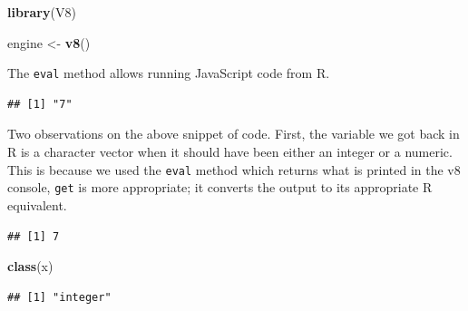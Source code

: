 \documentclass[
]{krantz}
\makeatletter
\newenvironment{Shaded}{\begin{snugshade}}{\end{snugshade}}
\newcommand{\CommentTok}[1]{\textcolor[rgb]{0.37,0.37,0.37}{\textit{#1}}}
\newcommand{\KeywordTok}[1]{\textcolor[rgb]{0.27,0.27,0.27}{\textbf{#1}}}
\newcommand{\NormalTok}[1]{#1}
\newcommand{\OperatorTok}[1]{\textcolor[rgb]{0.43,0.43,0.43}{\textbf{#1}}}
\newcommand{\StringTok}[1]{\textcolor[rgb]{0.5,0.5,0.5}{#1}}
\newenvironment{kframe}{%
\medskip{}
\setlength{\fboxsep}{.8em}
 \def\at@end@of@kframe{}%
 \ifinner\ifhmode%
  \def\at@end@of@kframe{\end{minipage}}%
  \begin{minipage}{\columnwidth}%
 \fi\fi%
 \def\FrameCommand##1{\hskip\@totalleftmargin \hskip-\fboxsep
 \colorbox{shadecolor}{##1}\hskip-\fboxsep
     \hskip-\linewidth \hskip-\@totalleftmargin \hskip\columnwidth}%
 \MakeFramed {\advance\hsize-\width
   \@totalleftmargin\z@ \linewidth\hsize
   \@setminipage}}%
 {\par\unskip\endMakeFramed%
 \at@end@of@kframe}
\renewenvironment{Shaded}{\begin{kframe}}{\end{kframe}}
\makeatother
\begin{document}
\begin{Shaded}
\begin{Highlighting}[]
\KeywordTok{library}\NormalTok{(V8)}

\NormalTok{engine <{-}}\StringTok{ }\KeywordTok{v8}\NormalTok{()}
\end{Highlighting}
\end{Shaded}

The \texttt{eval} method allows running JavaScript code from R.

\begin{Shaded}
\end{Shaded}

\begin{verbatim}
## [1] "7"
\end{verbatim}

Two observations on the above snippet of code. First, the variable we got back in R is a character vector when it should have been either an integer or a numeric. This is because we used the \texttt{eval} method which returns what is printed in the v8 console, \texttt{get} is more appropriate; it converts the output to its appropriate R equivalent.

\begin{Shaded}
\end{Shaded}

\begin{verbatim}
## [1] 7
\end{verbatim}

\begin{Shaded}
\begin{Highlighting}[]
\KeywordTok{class}\NormalTok{(x)}
\end{Highlighting}
\end{Shaded}

\begin{verbatim}
## [1] "integer"
\end{verbatim}
\end{document}
